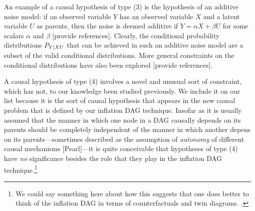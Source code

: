 An example of a causal hypothesis of type (3) is the hypothesis of an additive noise model: if an observed variable $Y$ has an observed variable $X$ and a latent variable $U$ as parents, then the noise is deemed additive if $Y=\alpha X + \beta U$ for some scalars $\alpha$ and $\beta$ [provide references].  Clearly, the conditional probability distributions $P_{Y|XU}$ that can be achieved in such an additive noise model are a subset of the valid conditional distributions.  More general constraints on the conditional distributions have also been explored [provide references].  

A causal hypothesis of type (4) involves a novel and unusual sort of constraint, which has not, to our knowledge been studied previously.  We include it on our list because it is the sort of causal hypothesis that appears in the new causal problem that is defined by our inflation DAG technique.  Insofar as it is usually assumed that the manner in which one node in a DAG causally depends on its parents should be completely independent of the manner in which another depens on its parents---sometimes described as the assumption of {\em autonomy} of different causal mechanisms [Pearl]---it is quite conceivable that hypotheses of type (4) have {\em no} significance besides the role that they play in the inflation DAG technique.\footnote{\color{red} We could say something here about how this suggests that one does better to think of the inflation DAG in terms of counterfactuals and twin diagrams. \color{black}.}




